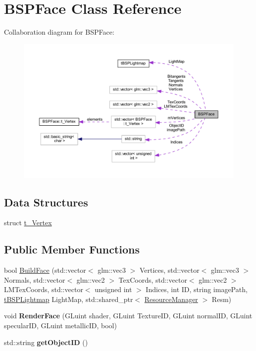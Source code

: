 \hypertarget{class_b_s_p_face}{}\section{B\+S\+P\+Face Class Reference}
\label{class_b_s_p_face}


Collaboration diagram for B\+S\+P\+Face\+:
\nopagebreak
\begin{figure}[H]
\begin{center}
\leavevmode
\includegraphics[width=350pt]{class_b_s_p_face__coll__graph}
\end{center}
\end{figure}
\subsection*{Data Structures}
\begin{DoxyCompactItemize}
\item 
struct \hyperlink{struct_b_s_p_face_1_1t___vertex}{t\+\_\+\+Vertex}
\end{DoxyCompactItemize}
\subsection*{Public Member Functions}
\begin{DoxyCompactItemize}
\item 
bool \hyperlink{class_b_s_p_face_a4ae99df1fc45845b5a3049c73eb6ae25}{Build\+Face} (std\+::vector$<$ glm\+::vec3 $>$ Vertices, std\+::vector$<$ glm\+::vec3 $>$ Normals, std\+::vector$<$ glm\+::vec2 $>$ Tex\+Coords, std\+::vector$<$ glm\+::vec2 $>$ L\+M\+Tex\+Coords, std\+::vector$<$ unsigned int $>$ Indices, int ID, string image\+Path, \hyperlink{structt_b_s_p_lightmap}{t\+B\+S\+P\+Lightmap} Light\+Map, std\+::shared\+\_\+ptr$<$ \hyperlink{class_resource_manager}{Resource\+Manager} $>$ Resm)
\item 
void {\bfseries Render\+Face} (G\+Luint shader, G\+Luint Texture\+ID, G\+Luint normal\+ID, G\+Luint specular\+ID, G\+Luint metallic\+ID, bool)\hypertarget{class_b_s_p_face_a254a767339d20aef7b14ab5c0d57406d}{}\label{class_b_s_p_face_a254a767339d20aef7b14ab5c0d57406d}

\item 
std\+::string {\bfseries get\+Object\+ID} ()\hypertarget{class_b_s_p_face_a4ca1b71cb722d7bb4f22b04ff5c3a9a3}{}\label{class_b_s_p_face_a4ca1b71cb722d7bb4f22b04ff5c3a9a3}

\end{DoxyCompactItemize}
